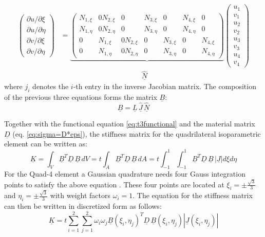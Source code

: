   \begin{align}
  \begin{pmatrix}
  {\partial u}/{\partial \xi} \\ {\partial u}/{\partial \eta} \\ {\partial v}/{\partial \xi} \\ {\partial v}/{\partial \eta}
  \end{pmatrix} &= \underbrace{\begin{pmatrix}
  N_{1,\xi}  & 0 N_{2,\xi}  & 0 & N_{3,\xi}  & 0 & N_{4,\xi}  & 0\\
  N_{1,\eta} & 0 N_{2,\eta} & 0 & N_{3,\eta} & 0 & N_{4,\eta} & 0\\
  0 & N_{1,\xi}  & 0 N_{2,\xi}  & 0 & N_{3,\xi}  & 0 & N_{4,\xi}\\
  0 & N_{1,\eta} & 0 N_{2,\eta} & 0 & N_{3,\eta} & 0 & N_{4,\eta}
  \end{pmatrix}} \begin{pmatrix}
  u_1\\v_1\\u_2\\v_2\\u_3\\v_3\\u_4\\v_4
  \end{pmatrix}\\
  &\qquad\qquad\qquad\qquad\qquad\quad\; \underline{\hat{N}} \nonumber
  \end{align}
  where $j_{i}$ denotes the $i$-th entry in the inverse Jacobian matrix.
  The composition of the previous three equations forms the matrix $\underline{B}$:
  \begin{equation}
  \underline{B} = \underline{L}\,\underline{\hat{J}}\,\underline{\hat{N}}
  \end{equation}
  

  Together with the functional equation \eqref{eq:t3functional} and the material matrix $\underline{D}$ (eq. \eqref{eq:sigma=D*eps}), the stiffness matrix for the quadrilateral isoparametric element can be written as:
  \begin{equation}
  \underline{K} = \int_V \underline{B}^T \underline{D}\,\underline{B}\, dV = t\int_A \underline{B}^T \underline{D}\,\underline{B}\, dA = t\int_{-1}^{1}\int_{-1}^{1} \underline{B}^T \underline{D}\,\underline{B}\, |\underline{J}| d\xi d\eta
  \end{equation}
  For the Quad-4 element a Gaussian quadrature needs four Gauss integration points to satisfy the above equation \cite{steinke2005finite}. These four points are located at $\xi_i = \pm \frac{\sqrt{3}}{3}$ and $\eta_i = \pm \frac{\sqrt{3}}{3}$ with weight factors $\omega_i = 1$. The equation for the stiffness matrix can then be written in discretized form as follows:
  \begin{equation}
  \underline{K} = t \sum_{i=1}^{2} \sum_{j=1}^{2} \omega_i \omega_j \underline{B}(\xi_i,\eta_j)^T \underline{D}\, \underline{B}(\xi_i,\eta_j) |\underline{J}(\xi_i,\eta_j)|
  \end{equation}
 
